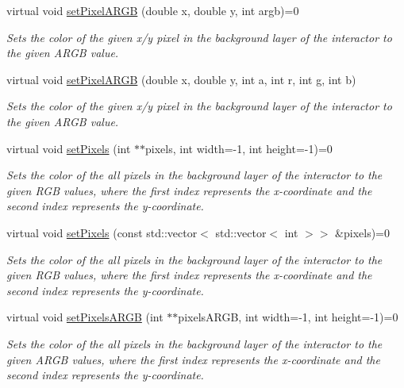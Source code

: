 \begin{DoxyCompactItemize}
virtual void \mbox{\hyperlink{classsgl_1_1GDrawingSurface_ab2f7c5a9462f552ad3f30d23c04605dd}{set\+Pixel\+A\+R\+GB}} (double x, double y, int argb)=0
\begin{DoxyCompactList}\small\item\em Sets the color of the given x/y pixel in the background layer of the interactor to the given A\+R\+GB value. \end{DoxyCompactList}\item 
virtual void \mbox{\hyperlink{classsgl_1_1GDrawingSurface_a62a8b1555ae3a073a84b0a1c071c65b1}{set\+Pixel\+A\+R\+GB}} (double x, double y, int a, int r, int g, int b)
\begin{DoxyCompactList}\small\item\em Sets the color of the given x/y pixel in the background layer of the interactor to the given A\+R\+GB value. \end{DoxyCompactList}\item 
virtual void \mbox{\hyperlink{classsgl_1_1GDrawingSurface_a7771c343e50fbc67cb309755840e512d}{set\+Pixels}} (int $\ast$$\ast$pixels, int width=-\/1, int height=-\/1)=0
\begin{DoxyCompactList}\small\item\em Sets the color of the all pixels in the background layer of the interactor to the given R\+GB values, where the first index represents the x-\/coordinate and the second index represents the y-\/coordinate. \end{DoxyCompactList}\item 
virtual void \mbox{\hyperlink{classsgl_1_1GDrawingSurface_a2c6a1d92542ef94306ea5dbcc11c8fdb}{set\+Pixels}} (const std\+::vector$<$ std\+::vector$<$ int $>$$>$ \&pixels)=0
\begin{DoxyCompactList}\small\item\em Sets the color of the all pixels in the background layer of the interactor to the given R\+GB values, where the first index represents the x-\/coordinate and the second index represents the y-\/coordinate. \end{DoxyCompactList}\item 
virtual void \mbox{\hyperlink{classsgl_1_1GDrawingSurface_a6d30ea30c0de2b983909be1438003ff1}{set\+Pixels\+A\+R\+GB}} (int $\ast$$\ast$pixels\+A\+R\+GB, int width=-\/1, int height=-\/1)=0
\begin{DoxyCompactList}\small\item\em Sets the color of the all pixels in the background layer of the interactor to the given A\+R\+GB values, where the first index represents the x-\/coordinate and the second index represents the y-\/coordinate. \end{DoxyCompactList}\item 
$$
\end{DoxyCompactItemize}
